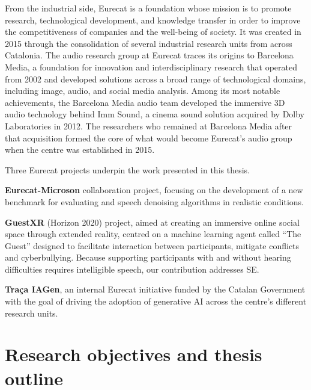 From the industrial side, Eurecat is a foundation whose mission is to promote research, technological development, and knowledge transfer in order to improve the competitiveness of companies and the well-being of society. It was created in 2015 through the consolidation of several industrial research units from across Catalonia. The audio research group at Eurecat traces its origins to Barcelona Media, a foundation for innovation and interdisciplinary research that operated from 2002 and developed solutions across a broad range of technological domains, including image, audio, and social media analysis. Among its most notable achievements, the Barcelona Media audio team developed the immersive 3D audio technology behind Imm Sound, a cinema sound solution acquired by Dolby Laboratories in 2012. The researchers who remained at Barcelona Media after that acquisition formed the core of what would become Eurecat's audio group when the centre was established in 2015.

Three Eurecat projects underpin the work presented in this thesis.

\begin{itemize}{
    \item \textbf{Eurecat-Microson} collaboration project, focusing on the development of a new benchmark for evaluating  and speech denoising algorithms in realistic conditions.
    
    \item \textbf{GuestXR} (Horizon 2020) project, aimed at creating an immersive online social space through extended reality, centred on a machine learning agent called ``The Guest'' designed to facilitate interaction between participants, mitigate conflicts and cyberbullying. Because supporting participants with and without hearing difficulties requires intelligible speech, our contribution addresses \acrshort{SE}.

    \item \textbf{Traça IAGen}, an internal Eurecat initiative funded by the Catalan Government with the goal of driving the adoption of generative AI across the centre's different research units.
}
\end{itemize}



\section{Research objectives and thesis outline}
\label{sec:outline}

